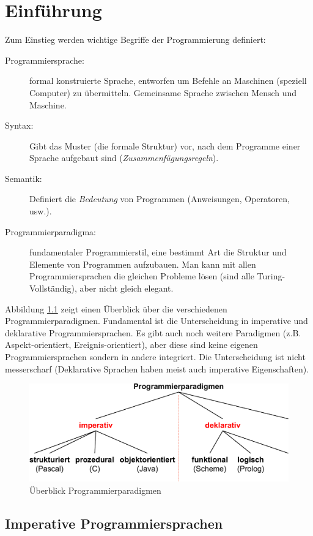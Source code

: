 \chapter{Einführung}

Zum Einstieg werden wichtige Begriffe der Programmierung definiert:

\begin{description}
	\item[Programmiersprache:] formal konstruierte Sprache, entworfen um Befehle an Maschinen (speziell Computer) zu übermitteln. Gemeinsame Sprache zwischen Mensch und Maschine.
	\item[Syntax:] Gibt das Muster (die formale Struktur) vor, nach dem Programme einer Sprache aufgebaut sind (\textit{Zusammenfügungsregeln}).
	\item[Semantik:] Definiert die \textit{Bedeutung} von Programmen (Anweisungen, Operatoren, usw.).
	\item[Programmierparadigma:] fundamentaler Programmierstil, eine bestimmt Art die Struktur und Elemente von Programmen aufzubauen. Man kann mit allen Programmiersprachen die gleichen Probleme lösen (sind alle Turing-Vollständig), aber nicht gleich elegant.
\end{description}

Abbildung \ref{fig:programmierparadigmen} zeigt einen Überblick über die verschiedenen Programmierparadigmen. Fundamental ist die Unterscheidung in imperative und deklarative Programmiersprachen. Es gibt auch noch weitere Paradigmen (z.B. Aspekt-orientiert, Ereignis-orientiert), aber diese sind keine eigenen Programmiersprachen sondern in andere integriert. Die Unterscheidung ist nicht messerscharf (Deklarative Sprachen haben meist auch imperative Eigenschaften).

\begin{figure}
\centering
\includegraphics[width=0.7\linewidth]{fig/programmierparadigmen}
\caption{Überblick Programmierparadigmen}
\label{fig:programmierparadigmen}
\end{figure}

\section{Imperative Programmiersprachen}

